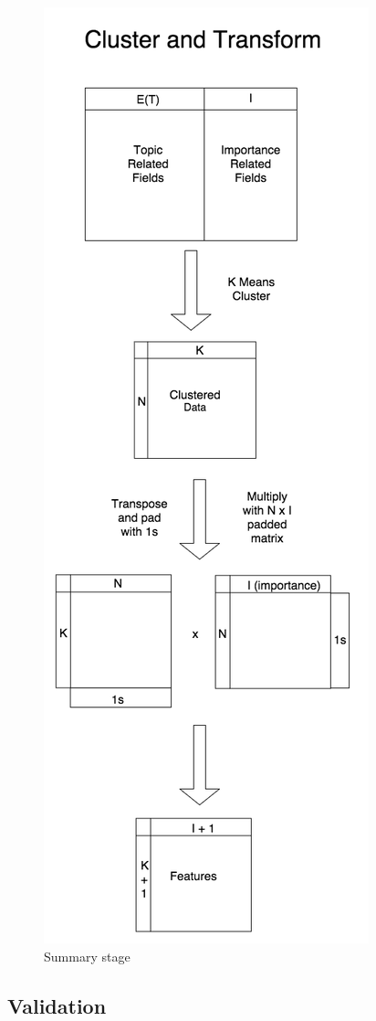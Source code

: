 \begin{figure}[ht]
\vskip 0.2in
\begin{center}
\centerline{\includegraphics[scale=0.15]{images/cluster_and_transform_vertical.png}}
\caption{Summary stage}
\end{center}
\vskip -0.2in
\label{fig:summarization}
\end{figure} 

\subsection{Validation}
